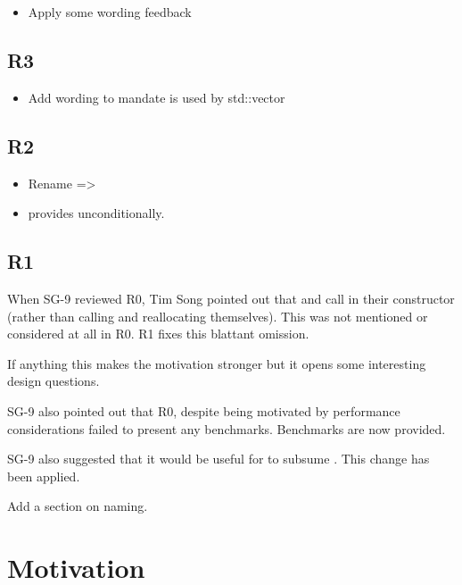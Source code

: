 \documentclass{wg21}
\begin{document}
\begin{itemize}
\item Apply some wording feedback
\end{itemize}


\subsection{R3}

\begin{itemize}
\item Add wording to mandate  is used by std::vector
\end{itemize}

\subsection{R2}

\begin{itemize}
\item Rename  => 
\item {} provides  unconditionally.
\end{itemize}

\subsection{R1}

When SG-9 reviewed R0, Tim Song pointed out that  and  call  in their constructor (rather than calling  and reallocating themselves).
This was not mentioned or considered at all in R0. R1 fixes this blattant omission.

If anything this makes the motivation stronger but it opens some interesting design questions.

SG-9 also pointed out that R0, despite being motivated by performance considerations failed to present any benchmarks. Benchmarks are now provided.

SG-9 also suggested that it would be useful for  to subsume .
This change has been applied.

Add a section on naming.

\section{Motivation}
\end{document}
